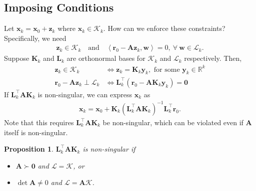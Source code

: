 \documentclass[12pt,a4paper]{article} %
\newtheorem*{proposition}{Proposition}
\begin{document}
\subsection{Imposing Conditions}
Let $\bm x_k = \bm x_0 + \bm z_k$ where $\bm x_k \in \mathcal K_k$.
How can we enforce these constraints? Specifically, we need
\begin{align*}
    \bm{z}_{k} \in \mathcal{K}_{k}
    \quad\text{and}\quad
    \left\langle\bm{r}_{0}-\mathbf{A} \bm{z}_{k}, \bm{w}\right\rangle= 0, ~\forall ~\bm{w} \in \mathcal{L}_{k}.
\end{align*}
Suppose $\mathbf K_k$ and $\mathbf L_k$ are orthonormal bases for $\mathcal K_k$
and $\mathcal L_k$ respectively.  Then, 
\begin{align*}
    \bm{z}_{k} \in \mathcal{K}_{k} &\iff  \bm z_k = \mathbf K_k \bm y_k, \text{ for some } \bm y_k \in \mathbb R^k \\ 
    \bm r_0 - \mathbf A \bm z_k \perp \mathcal L_k &\iff \mathbf L_k^\top (\bm r_0 - \mathbf A \mathbf K_k \bm y_k) = \mathbf 0
\end{align*}
If $\mathbf L_k^\top \mathbf A \mathbf K_k$ is non-singular, we can express $\bm x_k$ as 
\begin{align*}
    \bm x_k = \bm x_0 + \mathbf K_k (\mathbf L_k^\top \mathbf A \mathbf K_k)^{-1} \mathbf L_k^\top \bm r_0.
\end{align*}
Note that this requires $\mathbf L_k^\top \mathbf A \mathbf K_k$ be non-singular, which 
can be violated even if $\mathbf A$ itself is non-singular.

\begin{proposition}
    $\mathbf L_k^\top \mathbf A \mathbf K_k$ is non-singular if 
    \begin{itemize}
        \item $\mathbf A \succ \bm 0$ and $\mathcal L = \mathcal K$, or 
        \item $\det \mathbf A \ne 0$ and $\mathcal L = \mathbf A \mathcal K$.
    \end{itemize}
\end{proposition}
\end{document}
